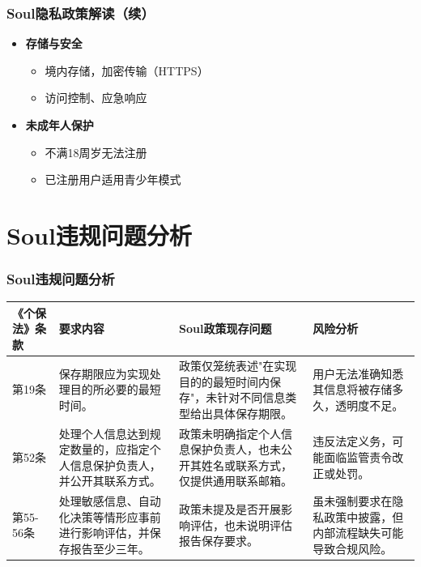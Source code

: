 \documentclass[AutoFakeBold,AutoFakeSlant]{beamer}
\begin{document}
\begin{frame}
	\frametitle{Soul隐私政策解读（续）}
	\begin{itemize}
		\item \textbf{存储与安全}
		\begin{itemize}
			\item 境内存储，加密传输（HTTPS）
			\item 访问控制、应急响应
		\end{itemize}
		
		\item \textbf{未成年人保护}
		\begin{itemize}
			\item 不满18周岁无法注册
			\item 已注册用户适用青少年模式
		\end{itemize}
	\end{itemize}
\end{frame}

\section{Soul违规问题分析}
\begin{frame}
	\frametitle{Soul违规问题分析}
	\tiny
	\begin{tabularx}{\textwidth}{|p{1.2cm}|p{2.2cm}|p{3cm}|p{3cm}|}
		\toprule
		\textbf{《个保法》条款} & \textbf{要求内容} & \textbf{Soul政策现存问题} & \textbf{风险分析} \\
		\midrule
		第19条 & 保存期限应为实现处理目的所必要的最短时间。 & 政策仅笼统表述"在实现目的的最短时间内保存"，未针对不同信息类型给出具体保存期限。 & 用户无法准确知悉其信息将被存储多久，透明度不足。 \\
		\midrule
		第52条 & 处理个人信息达到规定数量的，应指定个人信息保护负责人，并公开其联系方式。 & 政策未明确指定个人信息保护负责人，也未公开其姓名或联系方式，仅提供通用联系邮箱。 & 违反法定义务，可能面临监管责令改正或处罚。 \\
		\midrule
		第55-56条 & 处理敏感信息、自动化决策等情形应事前进行影响评估，并保存报告至少三年。 & 政策未提及是否开展影响评估，也未说明评估报告保存要求。 & 虽未强制要求在隐私政策中披露，但内部流程缺失可能导致合规风险。 \\
		\bottomrule
	\end{tabularx}
\end{frame}
\end{document}
